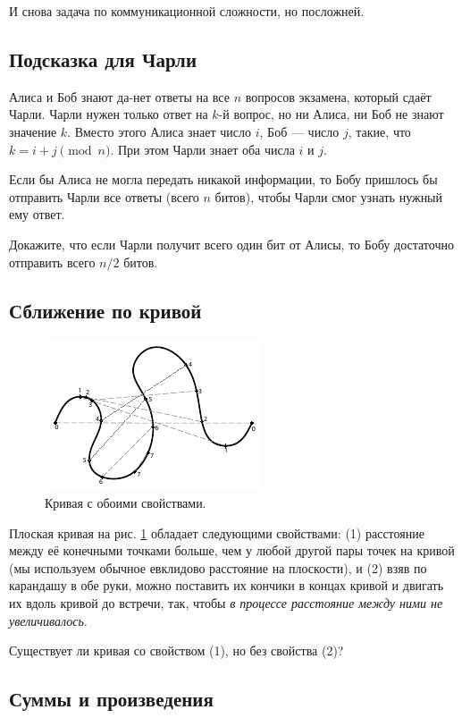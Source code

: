 \medskip

И снова задача по коммуникационной сложности, но посложней.

\subsection*{Подсказка для Чарли}

Алиса и Боб знают да-нет ответы на все $n$ вопросов экзамена, который сдаёт Чарли.
Чарли нужен только ответ на $k$-й вопрос, но ни Алиса, ни Боб не знают значение $k$.
Вместо этого Алиса знает число $i$, Боб --- число $j$, такие, что $k = i + j \pmod n$.
При этом Чарли знает оба числа $i$ и $j$.

Если бы Алиса не могла передать никакой информации,
то Бобу пришлось бы отправить Чарли все ответы (всего $n$ битов), чтобы Чарли смог узнать нужный ему ответ.

Докажите, что если Чарли получит всего один бит от Алисы, то Бобу достаточно отправить всего $n/2$ битов.

\subsection*{Сближение по кривой}

\begin{figure}[htb!]
\centering
\includegraphics[scale=1]{pics/s-curve}
\caption{Кривая с обоими свойствами.}
\label{pic:s-curv}
\end{figure}

Плоская кривая на рис. \ref{pic:s-curv} обладает следующими свойствами:
(1) расстояние между её конечными точками больше, чем у любой другой пары точек на кривой (мы используем обычное евклидово расстояние на плоскости),
и
(2) взяв по карандашу в обе руки, можно поставить их кончики в концах кривой и двигать их вдоль кривой до встречи, так, чтобы \emph{в процессе расстояние между ними не увеличивалось}.

Существует ли кривая со свойством (1), но без свойства (2)?


\subsection*{Суммы и произведения}

